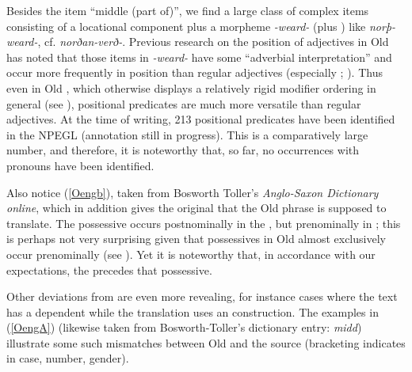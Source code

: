 \documentclass[output=paper,colorlinks,citecolor=brown]{langscibook}
\begin{document}
Besides the item ``middle (part of)'', we find a large class of complex items consisting of a locational component plus a morpheme \textit{-weard-} (plus ) like \textit{norþ-weard-}, cf.  \textit{norðan-verð-}. Previous research on the position of adjectives in Old  has noted that those items in \textit{-weard-} have some ``adverbial interpretation'' and occur more frequently in  position than regular adjectives (especially \citealt{Fischer01}; \citealt{Grabski17,Grabski20}). Thus even in Old , which otherwise displays a relatively rigid modifier ordering in general (see ), positional predicates are much more versatile than regular adjectives. 
At the time of writing, 213 positional predicates have been identified in the NPEGL  (annotation still in progress). This is a comparatively large number, and therefore, it is noteworthy that, so far, no occurrences with pronouns have been identified. 





 
Also notice (\ref{Oengb}), taken from Bosworth Toller's \textit{Anglo-Saxon Dictionary online}, which in addition gives the  original that the Old  phrase is supposed to translate. The possessive occurs postnominally in the , but prenominally in ; this is perhaps not very surprising given that possessives in Old  almost exclusively occur prenominally (see ). Yet it is noteworthy that, in accordance with our expectations, the  precedes that possessive.   

Other deviations from  are even more revealing, for instance cases where the  text has a  dependent while the  translation uses an  construction. The examples in (\ref{OengA}) (likewise taken from  Bosworth-Toller's dictionary entry: \textit{midd}) illustrate some such  mismatches between Old  and the  source (bracketing indicates  in case, number, gender).
\end{document}
